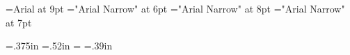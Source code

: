 \let\redpc\pcfee
\let\newgh\pcblu

\font\helv=Arial at 9pt
\font\helvx="Arial Narrow" at 6pt
\font\helvy="Arial Narrow" at 8pt
\font\helvz="Arial Narrow" at 7pt

\let\everymathextra\relax
\let\preamble\relax


\def\appendixstr{Appendix }


\let\seq\relax
\let\lname\relax
\let\sname\relax
\let\uname\relax
\let\chars\relax
\let\names\relax
\let\glyph\relax
\let\rglyf\relax
\let\image\relax
\let\notes\relax
\let\stags\relax

\let\sqdbcun\relax
\let\sqdbpua\relax
\let\sqseq\relax
\let\sqinv\relax
\let\sqchr\relax

\let\imagefloat\relax
\let\imagecaption\relax

\let\remfor\relax
\let\Hhhhh\relax

\def\unames{\eight\rm}

\def\ofs#1#2#3{}
\let\ofspc\pcxxv

\def\ccchr{\pcssxx}
\def\ccuni{\helvx}
\let\ccempty\relax

\def\beginchartlist{\begin{2column}\offinterlineskip} %
\def\endchartlist{\end{2column}\vfil\supereject}

\def\cclrow#1#2#3{%
        \vbox{\hsize3.2in\parindent0pt
              \hbox to 3.2in{%
              \hbox to .4in{\helvy#1\hfil}%
              \hbox to .4in{\pcssxx#2\hss}%
              \hbox to 2.4in{\hsize2.4in\vtop{\par\helvy\leavevmode\rightskip0pt plus1fil\relax#3\endgraf}}%
                            \hfil}}\vfil}
\def\cclnum#1{{\helv#1}}
\def\cclchr{\redpc}%
\def\ccluni{\Sans\eight\rm}

\let\twocol\relax

\let\glyf\relax
\let\fchr\relax
\let\fhex\relax
\let\dist\relax
\let\rhex\relax

\newdimen\ccwd \ccwd=.375in\relax
\newdimen\ccht \ccht=.52in\relax
\newdimen\cccwd \cccwd=\ccwd\relax
\newdimen\cccht \cccht=.39in\relax

\newdimen\cdliwd \cdliwd=2.75pc
\newdimen\slcwd \slcwd=3.65pc
\def\slcc{\pcssxxx}
\def\slcu{\helvy}

